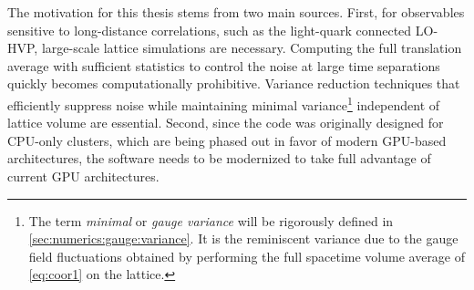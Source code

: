 
The motivation for this thesis stems from two main sources.
First, for observables sensitive to long-distance correlations, such as the light-quark connected LO-HVP, large-scale lattice simulations are necessary.
Computing the full translation average with sufficient statistics to control the noise at large time separations quickly becomes computationally prohibitive.
Variance reduction techniques that efficiently suppress noise while maintaining minimal variance\footnote{
The term \emph{minimal} or \emph{gauge variance} will be rigorously defined in \cref{sec:numerics:gauge:variance}.
It is the reminiscent variance due to the gauge field fluctuations obtained by performing the full spacetime volume average of \cref{eq:coor1} on the lattice.
} independent of lattice volume are essential.
Second, since the \openqxd code was originally designed for CPU-only clusters, which are being phased out in favor of modern GPU-based architectures, the software needs to be modernized to take full advantage of current GPU architectures.





